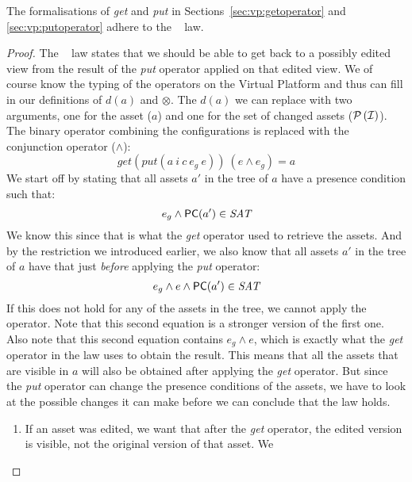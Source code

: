 \begin{theorem}
  The formalisations of \emph{get} and \emph{put} in Sections~\ref{sec:vp:getoperator}
  and \ref{sec:vp:putoperator} adhere to the \putget~ law.
\end{theorem}

\begin{proof}
  The \putget~ law states that we should be able to get back to a possibly edited
  view from the result of the \emph{put} operator applied on that edited view. We
  of course know the typing of the operators on the Virtual Platform and thus can
  fill in our definitions of $d(a)$ and $\otimes$. The $d(a)$ we can replace with
  two arguments, one for the asset ($a$) and one for the set of changed assets
  ($\mathcal{P} \left(\mathcal{I}\right)$). The binary operator combining the configurations
  is replaced with the conjunction operator ($\land$):
  \[
    \mathit{get}\left(\mathit{put}(a~i~c~e_g~e)\right)~\left(e\land e_g\right) = a
  \]
  We start off by stating that all assets $a'$ in the tree of $a$ have a presence 
  condition such that:
  \begin{equation}\label{eq:vp:get:pclimitation}
    e_g \land {\sf PC}(a') \in \textit{SAT}
  \end{equation}
  We know this since that is what the \emph{get} operator used to retrieve the
  assets. 
  And by the restriction we introduced earlier, we also know that all assets $a'$
  in the tree of $a$ have that just \emph{before} applying the \emph{put}
  operator:
  \begin{equation}\label{eq:vp:put:ambitionrestriction}
    e_g \land e \land {\sf PC}(a') \in \textit{SAT}
  \end{equation}
  If this does not hold for any of the assets in the tree, we cannot apply the
  operator. Note that this second equation is a stronger version of the first
  one. Also note that this second equation contains $e_g \land e$, which is
  exactly what the \emph{get} operator in the law uses to obtain the result. This
  means that all the assets that are visible in $a$ will also be obtained after
  applying the \emph{get} operator. But since the \emph{put} operator can change
  the presence conditions of the assets, we have to look at the possible changes
  it can make before we can conclude that the law holds.
  \begin{enumerate}
    \item If an asset was edited, we want that after the \emph{get} operator, the
          edited version is visible, not the original version of that asset. We

\end{enumerate}
\end{proof}
